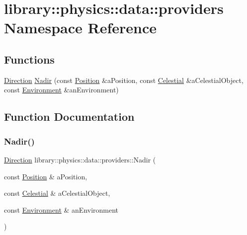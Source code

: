 \hypertarget{namespacelibrary_1_1physics_1_1data_1_1providers}{}\section{library\+:\+:physics\+:\+:data\+:\+:providers Namespace Reference}
\label{namespacelibrary_1_1physics_1_1data_1_1providers}
\subsection*{Functions}
\begin{DoxyCompactItemize}
\item 
\hyperlink{classlibrary_1_1physics_1_1data_1_1_direction}{Direction} \hyperlink{namespacelibrary_1_1physics_1_1data_1_1providers_a4b0265241e78be7986eaaaa2857263c7}{Nadir} (const \hyperlink{classlibrary_1_1physics_1_1coord_1_1_position}{Position} \&a\+Position, const \hyperlink{classlibrary_1_1physics_1_1env_1_1obj_1_1_celestial}{Celestial} \&a\+Celestial\+Object, const \hyperlink{classlibrary_1_1physics_1_1_environment}{Environment} \&an\+Environment)
\end{DoxyCompactItemize}


\subsection{Function Documentation}
\mbox{\label{namespacelibrary_1_1physics_1_1data_1_1providers_a4b0265241e78be7986eaaaa2857263c7}} 
\subsubsection{\texorpdfstring{Nadir()}{Nadir()}}
{\footnotesize\ttfamily \hyperlink{classlibrary_1_1physics_1_1data_1_1_direction}{Direction} library\+::physics\+::data\+::providers\+::\+Nadir (\begin{DoxyParamCaption}\item[{const \hyperlink{classlibrary_1_1physics_1_1coord_1_1_position}{Position} \&}]{a\+Position,  }\item[{const \hyperlink{classlibrary_1_1physics_1_1env_1_1obj_1_1_celestial}{Celestial} \&}]{a\+Celestial\+Object,  }\item[{const \hyperlink{classlibrary_1_1physics_1_1_environment}{Environment} \&}]{an\+Environment }\end{DoxyParamCaption})}

